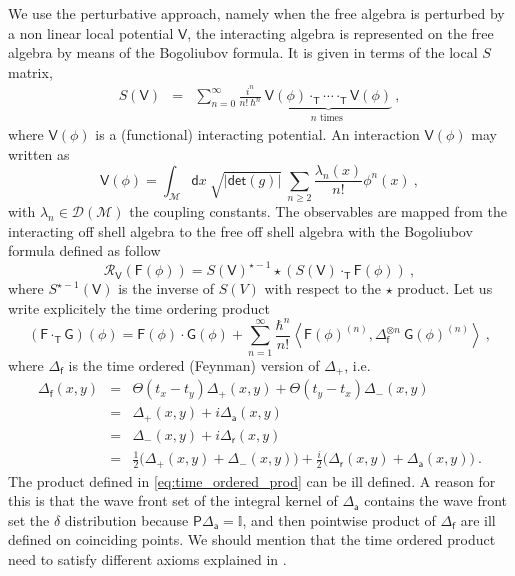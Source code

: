\documentclass[12pt]{book}
\renewcommand{\det}{\mathsf{det}}
\newcommand{\abs}[1]{\left|#1\right|}
\newcommand{\sm}[1]{\left\langle#1\right\rangle}
\let\int\int
\newcommand{\Dcal}{\mathcal{D}}
\newcommand{\Mcal}{\mathcal{M}}
\newcommand{\Rcal}{\mathcal{R}}
\newcommand{\Ibb}{\mathbb{I}}
\newcommand{\Fsf}{\mathsf{F}}
\newcommand{\Gsf}{\mathsf{G}}
\newcommand{\Psf}{\mathsf{P}}
\newcommand{\Tsf}{\mathsf{T}}
\newcommand{\Vsf}{\mathsf{V}}
\newcommand{\asf}{\mathsf{a}}
\newcommand{\dsf}{\mathsf{d}}
\newcommand{\fsf}{\mathsf{f}}
\newcommand{\rsf}{\mathsf{r}}
\theoremstyle{break}
\begin{document}
We use the perturbative approach, namely when the free algebra is perturbed by a non linear local potential $\Vsf$, the interacting algebra is represented on the free algebra by means of the Bogoliubov formula. It is given in terms of the local $S$ matrix, 
%
\begin{eqnarray*}
S(\Vsf) &=& \sum^\infty_{n=0} \frac{i^n}{n!\ \hbar^n} \ \underbrace{\Vsf(\phi) \cdot_\Tsf \cdots \cdot_\Tsf \Vsf(\phi)}_{n \mbox{ times }} \ , 
\end{eqnarray*}
%
where $\Vsf(\phi)$ is a (functional) interacting potential. An interaction $\Vsf(\phi)$ may written as 
%
\begin{equation*}
\Vsf(\phi) = \int_\Mcal \dsf x \ \sqrt{\abs{\det(g)}} \ \sum_{n\geq 2} \frac{\lambda_n(x)}{n!} \phi^n(x) \ ,
\end{equation*}
%
with $\lambda_n \in \Dcal(\Mcal)$ the coupling constants. The observables are mapped from the interacting off shell algebra to the free off shell algebra with the Bogoliubov formula defined as follow 
%
\begin{equation}
\Rcal_\Vsf(\Fsf(\phi)) = S(\Vsf)^{\star-1} \star \left( S(\Vsf) \cdot_\Tsf \Fsf(\phi) \right) \ ,
\label{eq:bogoliubov}
\end{equation}
%
where $S^{\star-1}(\Vsf)$ is the inverse of $S(V)$ with respect to the $\star$ product. Let us write explicitely the time ordering product
%
\begin{equation}
(\Fsf \cdot_\Tsf  \Gsf)(\phi) = \Fsf(\phi) \cdot \Gsf(\phi) + \sum_{n=1}^\infty \frac{\hbar^n}{n!} \sm{ \Fsf(\phi)^{(n)} , \Delta_\fsf^{\otimes n} \ \Gsf(\phi)^{(n)} } \ ,
\label{eq:time_ordered_prod}
\end{equation}
%
where $\Delta_\fsf$ is the time ordered (Feynman) version of $\Delta_+$, i.e.
%
\begin{eqnarray}
\Delta_\fsf(x,y) &=& \Theta(t_x-t_y) \Delta_+(x,y) + \Theta(t_y-t_x) \Delta_-(x,y) \nonumber \\
&=& \Delta_+(x,y) + i \Delta_\asf(x,y) \\
&=& \Delta_-(x,y) + i \Delta_\rsf(x,y) \nonumber \\
&=& \frac12 \bigg( \Delta_+(x,y) + \Delta_-(x,y) \bigg) + \frac{i}{2} \bigg(\Delta_\rsf(x,y) + \Delta_\asf(x,y) \bigg) \ . \nonumber
\label{eq:conv_feynman_prop}
\end{eqnarray}
%
The product defined in \eqref{eq:time_ordered_prod} can be ill defined. A reason for
this is that the wave front set of the integral kernel of $\Delta_\asf$ contains the wave front set the $\delta$ distribution because $\Psf \Delta_\asf = \Ibb$, and then pointwise product of $\Delta_\fsf$ are ill defined on coinciding points. We should mention that the time ordered product need to satisfy different axioms explained in \cite{hollands_existence_2002}.
\end{document}
